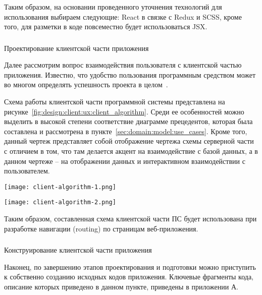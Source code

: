 Таким образом, на основании проведенного уточнения технологий для использования выбираем следующие:
React в связке с Redux и SCSS, кроме того, для разметки в коде повсеместно будет использоваться JSX.

\subsubsection{} Проектирование клиентской части приложения
\label{sec:design:client:ux}

Далее рассмотрим вопрос взаимодействия пользователя с клиентской частью приложения. Известно, что удобство пользования
программным средством может во многом определять успешность проекта в целом~\cite{code_complete}.

Схема работы клиентской части программной системы представлена на рисунке~\ref{fig:design:client:ux:client_algorithm}.
Среди ее особенностей можно выделить в высокой степени соответствие диаграмме прецедентов, которая была составлена и
рассмотрена в пункте~\ref{sec:domain:model:use_cases}. Кроме того, данный чертеж представляет собой отображение чертежа
схемы серверной части с отличием в том, что там делается акцент на взаимодействие с базой данных, а в данном чертеже --
на отображении данных и интерактивном взаимодействии с пользователем.

\begin{sidewaysfigure}
  \centering
    \texttt{[image: client-algorithm-1.png]}
    \caption{Схема программы клиентской части программного средства}
    \label{fig:design:client:ux:client_algorithm}
  \end{sidewaysfigure}
  
  \begin{sidewaysfigure}
  \ContinuedFloat
  \centering
    \texttt{[image: client-algorithm-2.png]}
    \caption{Схема программы клиентской части программного средства (окончание)}
  \end{sidewaysfigure}

Таким образом, составленная схема клиентской части ПС будет использована при разработке навигации (routing) по
страницам веб-приложе\-ния.

\subsubsection{} Конструирование клиентской части приложения
\label{sec:design:client:development}

Наконец, по завершению этапов проектирования и подготовки можно приступить к собственно созданию исходных кодов
приложения. Ключевые фрагменты кода, описание которых приведено в данном пункте, приведены в приложении А.

